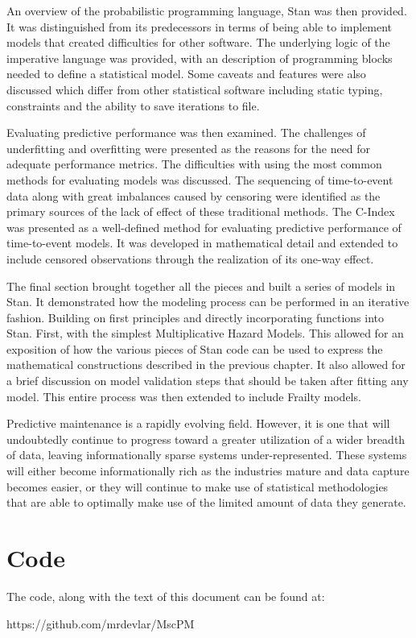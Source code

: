 An overview of the probabilistic programming language, Stan was then provided. It was distinguished from its predecessors in terms of being able to implement models that created difficulties for other software. The underlying logic of the imperative  language was provided, with an description of programming blocks needed to define a statistical model. Some caveats and features were also discussed which differ from other statistical software including static typing, constraints and the ability to save iterations to file.

Evaluating predictive performance was then examined. The challenges of underfitting and overfitting were presented as the reasons for the need for adequate performance metrics. The difficulties with using the most common methods for evaluating models was discussed. The sequencing of time-to-event data along with great imbalances caused by censoring were identified as the primary sources of the lack of effect of these traditional methods. The C-Index was presented as a well-defined method for evaluating predictive performance of time-to-event models. It was developed in mathematical detail and extended to include censored observations through the realization of its one-way effect.

The final section brought together all the pieces and built a series of models in Stan. It demonstrated how the modeling process can be performed in an iterative fashion. Building on first principles and directly incorporating functions into Stan. First, with the simplest Multiplicative Hazard Models. This allowed for an exposition of how the various pieces of Stan code can be used to express the mathematical constructions described in the previous chapter. It also allowed for a brief discussion on model validation steps that should be taken after fitting any model. This entire process was then extended to include Frailty models. 

Predictive maintenance is a rapidly evolving field. However, it is one that will undoubtedly continue to progress toward a greater utilization of a wider breadth of data, leaving informationally sparse systems under-represented. These systems will either become informationally rich as the industries mature and data capture becomes easier, or they will continue to make use of statistical methodologies that are able to optimally make use of the limited amount of data they generate.







\section*{Code}


The code, along with the text of this document can be found at:

https://github.com/mrdevlar/MscPM